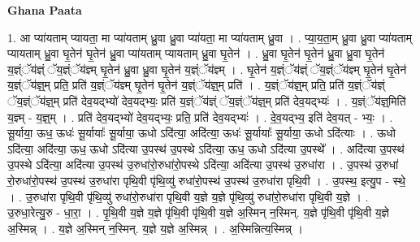 \documentclass[17pt]{extarticle}
\begin{document}
\textbf{Ghana Paata } \newline

1. आ प्या॑यताम् प्यायता॒ मा प्या॑यताम् ध्रु॒वा ध्रु॒वा प्या॑यता॒ मा प्या॑यताम् ध्रु॒वा । . प्या॒य॒ता॒म् ध्रु॒वा ध्रु॒वा प्या॑यताम् प्यायताम् ध्रु॒वा घृ॒तेन॑ घृ॒तेन॑ ध्रु॒वा प्या॑यताम् प्यायताम् ध्रु॒वा घृ॒तेन॑ । . ध्रु॒वा घृ॒तेन॑ घृ॒तेन॑ ध्रु॒वा ध्रु॒वा घृ॒तेन॑ य॒ज्ञ्ंॅय॑ज्ञ्ं ॅय॒ज्ञ्ंॅय॑ज्ञ्म् घृ॒तेन॑ ध्रु॒वा ध्रु॒वा घृ॒तेन॑ य॒ज्ञ्ंॅय॑ज्ञ्म् । . घृ॒तेन॑ य॒ज्ञ्ंॅय॑ज्ञ्ं ॅय॒ज्ञ्ंॅय॑ज्ञ्म् घृ॒तेन॑ घृ॒तेन॑ य॒ज्ञ्ंॅय॑ज्ञ्॒म् प्रति॒ प्रति॑ य॒ज्ञ्ंॅय॑ज्ञ्म् घृ॒तेन॑ घृ॒तेन॑ य॒ज्ञ्ंॅय॑ज्ञ्॒म् प्रति॑ । . य॒ज्ञ्ंॅय॑ज्ञ्॒म् प्रति॒ प्रति॑ य॒ज्ञ्ंॅय॑ज्ञ्ं ॅय॒ज्ञ्ंॅय॑ज्ञ्॒म् प्रति॑ देव॒यद्भ्यो॑ देव॒यद्भ्यः॒ प्रति॑ य॒ज्ञ्ंॅय॑ज्ञ्ं ॅय॒ज्ञ्ंॅय॑ज्ञ्॒म् प्रति॑ देव॒यद्भ्यः॑ । . य॒ज्ञ्ंॅय॑ज्ञ्॒मिति॑ य॒ज्ञ्म् - य॒ज्ञ्॒म् । . प्रति॑ देव॒यद्भ्यो॑ देव॒यद्भ्यः॒ प्रति॒ प्रति॑ देव॒यद्भ्यः॑ । . दे॒व॒यद्भ्य॒ इति॑ देव॒यत् - भ्यः॒ । . सू॒र्याया॒ ऊध॒ ऊधः॑ सू॒र्यायाः᳚ सू॒र्याया॒ ऊधो ऽदि॑त्या॒ अदि॑त्या॒ ऊधः॑ सू॒र्यायाः᳚ सू॒र्याया॒ ऊधो ऽदि॑त्याः । . ऊधो ऽदि॑त्या॒ अदि॑त्या॒ ऊध॒ ऊधो ऽदि॑त्या उ॒पस्थ॑ उ॒पस्थे ऽदि॑त्या॒ ऊध॒ ऊधो ऽदि॑त्या उ॒पस्थे᳚ । . अदि॑त्या उ॒पस्थ॑ उ॒पस्थे ऽदि॑त्या॒ अदि॑त्या उ॒पस्थ॑ उ॒रुधा॑रो॒रुधा॑रो॒पस्थे ऽदि॑त्या॒ अदि॑त्या उ॒पस्थ॑ उ॒रुधा॑रा । . उ॒पस्थ॑ उ॒रुधा॑ रो॒रुधा॑रो॒पस्थ॑ उ॒पस्थ॑ उ॒रुधा॑रा पृथि॒वी पृ॑थि॒व्यु॑ रुधा॑रो॒पस्थ॑ उ॒पस्थ॑ उ॒रुधा॑रा पृथि॒वी । . उ॒पस्थ॒ इत्यु॒प - स्थे॒ । . उ॒रुधा॑रा पृथि॒वी पृ॑थि॒व्यु॑ रुधा॑रो॒रुधा॑रा पृथि॒वी य॒ज्ञे य॒ज्ञे पृ॑थि॒व्यु॑ रुधा॑रो॒रुधा॑रा पृथि॒वी य॒ज्ञे । . उ॒रुधा॒रेत्यु॒रु - धा॒रा॒ । . पृ॒थि॒वी य॒ज्ञे य॒ज्ञे पृ॑थि॒वी पृ॑थि॒वी य॒ज्ञे अ॒स्मिन् न॒स्मिन्. य॒ज्ञे पृ॑थि॒वी पृ॑थि॒वी य॒ज्ञे अ॒स्मिन्न् । . य॒ज्ञे अ॒स्मिन् न॒स्मिन्. य॒ज्ञे य॒ज्ञे अ॒स्मिन्न् । . अ॒स्मिन्नित्य॒स्मिन्न् । \newline
\end{document}
